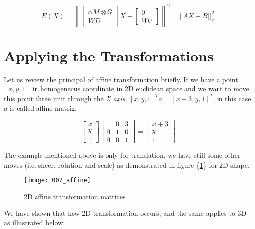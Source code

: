 \documentclass[../structure.tex]{subfiles}
\begin{document}
\begin{equation}
\bar{E}(X) = \left\|
\begin{bmatrix}
\alpha M \otimes G \\ WD
\end{bmatrix}
X -
\begin{bmatrix}
0 \\ WU
\end{bmatrix}
\right\| ^2 = ||AX - B||_{F}^2
\label{equ:finalCostFun}
\end{equation}

\section{Applying the Transformations}
Let us review the principal of affine transformation briefly. If we have a point $[x,y,1]$ in homogeneous coordinate in 2D euclidean space and we want to move this point three unit through the \textit{X axis}, $[x,y,1]^T a = [x+3,y,1]^T$, in this case $a$ is called affine matrix.

\begin{equation*}
\begin{bmatrix}
x \\ y \\ 1
\end{bmatrix}
\begin{bmatrix}
1 & 0 & 3 \\
0 & 1 & 0 \\
0 & 0 & 1
\end{bmatrix}
=
\begin{bmatrix}
x + 3 \\ y \\ 1
\end{bmatrix}
\end{equation*}

The example mentioned above is only for translation, we have still some other moves (i.e. sheer, rotation and scale) as demonstrated in figure \{\ref{fig:affine}\} for 2D shape.

\begin{figure}[h!]
\centering
\texttt{[image: 007\_affine]}
\captionsetup{justification=centering}
\caption{2D affine transformation matrices \cite{Wikipedia2016}}
\label{fig:affine}
\end{figure}

We have shown that how 2D transformation occurs, and the same applies to 3D as illustrated below:
\end{document}
